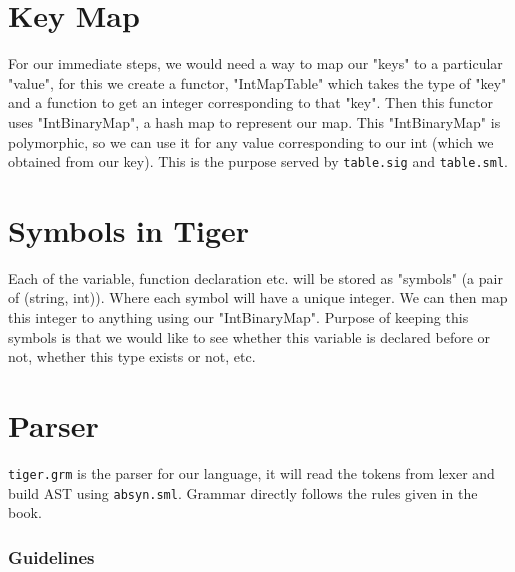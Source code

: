 \section{Key Map}

For our immediate steps, we would need a way to map our "keys" to a particular "value", for this we create a functor, "IntMapTable" which takes the type of "key" and a function to get an integer corresponding to that "key". Then this functor uses "IntBinaryMap", a hash map to represent our map. This "IntBinaryMap" is polymorphic, so we can use it for any value corresponding to our int (which we obtained from our key). This is the purpose served by \texttt{table.sig} and \texttt{table.sml}. 

\section{Symbols in Tiger}


Each of the variable, function declaration etc. will be stored as "symbols" (a pair of (string, int)). Where each symbol will have a unique integer. We can then map this integer to anything using our "IntBinaryMap". Purpose of keeping this symbols is that we would like to see whether this variable is declared before or not, whether this type exists or not, etc.

\section{Parser}


\texttt{tiger.grm} is the parser for our language, it will read the tokens from lexer and build AST using \texttt{absyn.sml}. Grammar directly follows the rules given in the book. 

\subsubsection{Guidelines}

